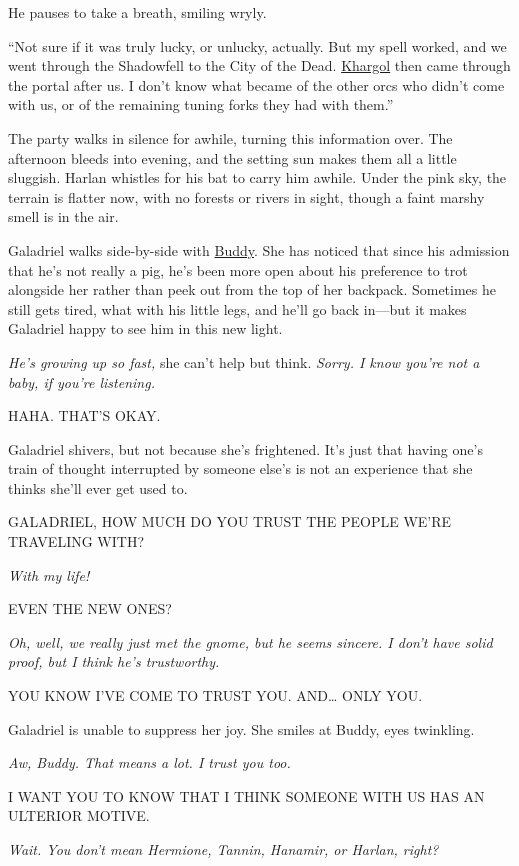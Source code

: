 \documentclass[smalldemyvopaper,11pt,twoside,onecolumn,openright,extrafontsizes]{memoir}
\begin{document}
He pauses to take a breath, smiling wryly.

``Not sure if it was truly lucky, or unlucky, actually. But my spell
worked, and we went through the Shadowfell to the City of the Dead.
\href{/characters/khargol/}{Khargol} then came through the portal after
us. I don't know what became of the other orcs who didn't come with us,
or of the remaining tuning forks they had with them.''

The party walks in silence for awhile, turning this information over.
The afternoon bleeds into evening, and the setting sun makes them all a
little sluggish. Harlan whistles for his bat to carry him awhile. Under
the pink sky, the terrain is flatter now, with no forests or rivers in
sight, though a faint marshy smell is in the air.

Galadriel walks side-by-side with \href{/characters/buddy/}{Buddy}. She
has noticed that since his admission that he's not really a pig, he's
been more open about his preference to trot alongside her rather than
peek out from the top of her backpack. Sometimes he still gets tired,
what with his little legs, and he'll go back in---but it makes Galadriel
happy to see him in this new light.

\emph{He's growing up so fast,} she can't help but think. \emph{Sorry. I
know you're not a baby, if you're listening.}

HAHA. THAT'S OKAY.

Galadriel shivers, but not because she's frightened. It's just that
having one's train of thought interrupted by someone else's is not an
experience that she thinks she'll ever get used to.

GALADRIEL, HOW MUCH DO YOU TRUST THE PEOPLE WE'RE TRAVELING WITH?

\emph{With my life!}

EVEN THE NEW ONES?

\emph{Oh, well, we really just met the gnome, but he seems sincere. I
don't have solid proof, but I think he's trustworthy.}

YOU KNOW I'VE COME TO TRUST YOU. AND\ldots{} ONLY YOU.

Galadriel is unable to suppress her joy. She smiles at Buddy, eyes
twinkling.

\emph{Aw, Buddy. That means a lot. I trust you too.}

I WANT YOU TO KNOW THAT I THINK SOMEONE WITH US HAS AN ULTERIOR MOTIVE.

\emph{Wait. You don't mean Hermione, Tannin, Hanamir, or Harlan, right?}
\end{document}
